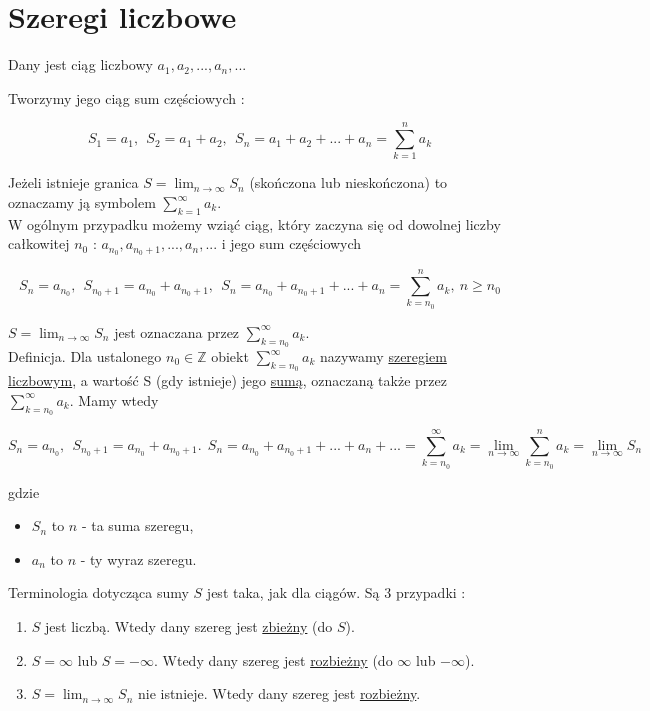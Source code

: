 \section{Szeregi liczbowe}

Dany jest ciąg liczbowy $ a_1, a_2, ..., a_n, ... $

Tworzymy jego ciąg sum częściowych :

$$ S_1 = a_1, \ \ S_2 = a_1 + a_2, \ \ S_n = a_1 + a_2 + ... + a_n = \sum\limits_{k = 1}^{n} a_k $$

Jeżeli istnieje granica $ S = \lim_{n \to \infty} S_n $ (skończona lub nieskończona) to oznaczamy ją symbolem 
$ \sum_{k = 1}^{\infty} a_k $. \\

W ogólnym przypadku możemy wziąć ciąg, który zaczyna się od dowolnej liczby całkowitej \linebreak $ n_0 $ : $ a_{n_0}, a_{n_0 + 1}, ..., a_n, ... $
i jego sum częściowych

$$ S_n = a_{n_0}, \ \ S_{n_0 + 1} = a_{n_0} + a_{n_0 + 1}, \ \ S_n = a_{n_0} + a_{n_0 + 1} + ... + a_n = \sum\limits_{k = n_0}^{n} a_k, \ n \geq n_0 $$

$ S = \lim_{n \to \infty} S_n $ jest oznaczana przez $ \sum\limits_{k = n_0}^{\infty} a_k $. \\

Definicja. Dla ustalonego $ n_0 \in \mathbb{Z} $ obiekt $ \sum\limits_{k = n_0}^{\infty} a_k $ nazywamy \underline{szeregiem liczbowym},
a wartość S (gdy istnieje) jego \underline{sumą}, oznaczaną także przez $ \sum\limits_{k = n_0}^{\infty} a_k $. Mamy wtedy

$$ S_n = a_{n_0}, \ \ S_{n_0 + 1} = a_{n_0} + a_{n_0 + 1}. \ \ S_n = a_{n_0} + a_{n_0 + 1} + ... + a_n + ... = 
\sum\limits_{k = n_0}^{\infty} a_k = \lim_{n \to \infty} \sum\limits_{k = n_0}^{n} a_k = \lim_{n \to \infty} S_n $$

gdzie

\begin{itemize}
    \item $ S_n $ to $n$ - ta suma szeregu,
    \item $ a_n $ to $n$ - ty wyraz szeregu. \\
\end{itemize}

Terminologia dotycząca sumy $S$ jest taka, jak dla ciągów. Są 3 przypadki : 

\begin{enumerate}
    \item $S$ jest liczbą. Wtedy dany szereg jest \underline{zbieżny} (do $S$).
    \item $S = \infty$ lub $S = -\infty$. Wtedy dany szereg jest \underline{rozbieżny} (do $\infty$ lub $-\infty$).
    \item $ S = \lim_{n \to \infty} S_n $ nie istnieje. Wtedy dany szereg jest \underline{rozbieżny}. \\
\end{enumerate}

